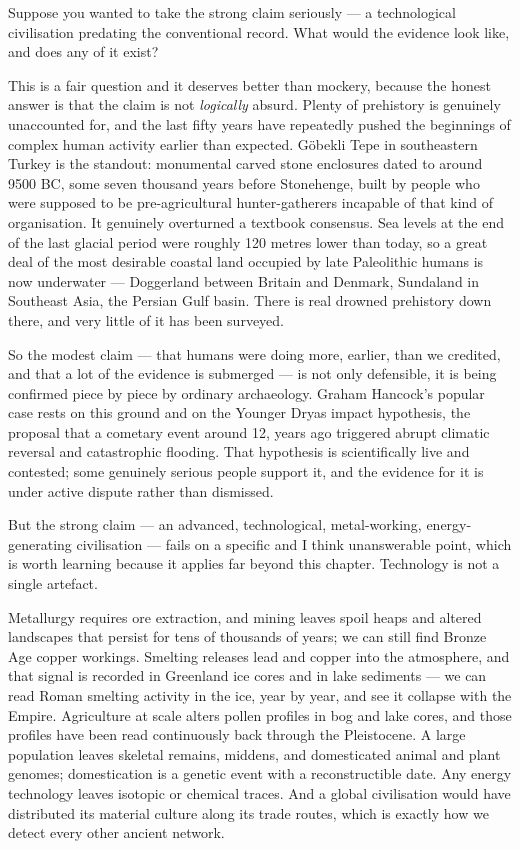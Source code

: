 Suppose you wanted to take the strong claim seriously --- a technological civilisation predating the
conventional record. What would the evidence look like, and does any of it exist?

This is a fair question and it deserves better than mockery, because the honest answer is that the
claim is not \emph{logically} absurd. Plenty of prehistory is genuinely unaccounted for, and the last
fifty years have repeatedly pushed the beginnings of complex human activity earlier than expected.
Göbekli Tepe in southeastern Turkey is the standout: monumental carved stone enclosures dated to
around 9500 BC, some seven thousand years before Stonehenge, built by people who were supposed to be
pre-agricultural hunter-gatherers incapable of that kind of organisation. It genuinely overturned a
textbook consensus. Sea levels at the end of the last glacial period were roughly 120 metres lower
than today, so a great deal of the most desirable coastal land occupied by late Paleolithic humans is
now underwater --- Doggerland between Britain and Denmark, Sundaland in Southeast Asia, the Persian
Gulf basin. There is real drowned prehistory down there, and very little of it has been surveyed.

So the modest claim --- that humans were doing more, earlier, than we credited, and that a lot of the
evidence is submerged --- is not only defensible, it is being confirmed piece by piece by ordinary
archaeology. Graham Hancock's popular case rests on this ground and on the Younger Dryas impact
hypothesis, the proposal that a cometary event around 12, years ago triggered abrupt climatic
reversal and catastrophic flooding. That hypothesis is scientifically live and contested; some
genuinely serious people support it, and the evidence for it is under active dispute rather than
dismissed.

But the strong claim --- an advanced, technological, metal-working, energy-generating civilisation ---
fails on a specific and I think unanswerable point, which is worth learning because it applies far
beyond this chapter. Technology is not a single artefact. 

Metallurgy requires ore extraction, and mining leaves spoil heaps and altered landscapes that persist
for tens of thousands of years; we can still find Bronze Age copper workings. Smelting releases lead
and copper into the atmosphere, and that signal is recorded in Greenland ice cores and in lake
sediments --- we can read Roman smelting activity in the ice, year by year, and see it collapse with
the Empire. Agriculture at scale alters pollen profiles in bog and lake cores, and those profiles have
been read continuously back through the Pleistocene. A large population leaves skeletal remains,
middens, and domesticated animal and plant genomes; domestication is a genetic event with a
reconstructible date. Any energy technology leaves isotopic or chemical traces. And a global
civilisation would have distributed its material culture along its trade routes, which is exactly how
we detect every other ancient network.

